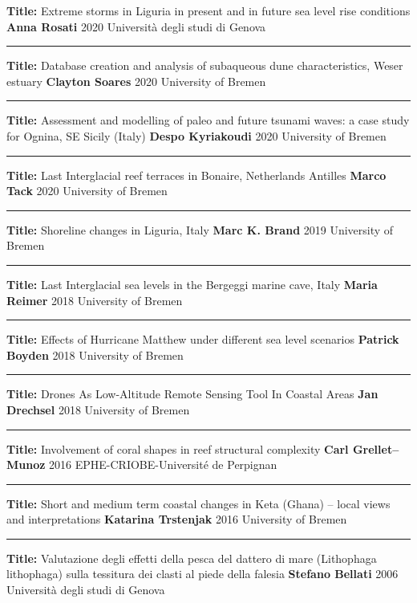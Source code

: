 \documentclass[%
               doublesided,
               paper=a4,
               fontsize=10pt
              ]{my-resume}
\begin{document}
    \publication
	{\textbf{Title:} Extreme storms in Liguria in present and in future sea level rise conditions} %
	{\textbf{Anna Rosati}} %
	{2020} %
	{Università degli studi di Genova} %
	{} %
\smallskip
\hrule
\smallskip
    \publication
	{\textbf{Title:} Database creation and analysis of subaqueous dune characteristics, Weser estuary} %
	{\textbf{Clayton Soares}} %
	{2020} %
	{University of Bremen} %
	{} %
\smallskip
\hrule
\smallskip
    \publication
	{\textbf{Title:} Assessment and modelling of paleo and future tsunami waves: a case study for Ognina, SE Sicily (Italy)} %
	{\textbf{Despo Kyriakoudi}} %
	{2020} %
	{University of Bremen} %
	{} %
\smallskip
\hrule
\smallskip
    \publication
	{\textbf{Title:} Last Interglacial reef terraces in Bonaire, Netherlands Antilles} %
	{\textbf{Marco Tack}} %
	{2020} %
	{University of Bremen} %
	{} %
\smallskip
\hrule
\smallskip
    \publication
	{\textbf{Title:} Shoreline changes in Liguria, Italy} %
	{\textbf{Marc K. Brand}} %
	{2019} %
	{University of Bremen} %
	{} %
\smallskip
\hrule
\smallskip
    \publication
	{\textbf{Title:} Last Interglacial sea levels in the Bergeggi marine cave, Italy} %
	{\textbf{Maria Reimer}} %
	{2018} %
	{University of Bremen} %
	{} %
\smallskip
\hrule
\smallskip
    \publication
	{\textbf{Title:} Effects of Hurricane Matthew under different sea level scenarios} %
	{\textbf{Patrick Boyden}} %
	{2018} %
	{University of Bremen} %
	{} %
\smallskip
\hrule
\smallskip
    \publication
	{\textbf{Title:} Drones As Low-Altitude Remote Sensing Tool In Coastal Areas} %
	{\textbf{Jan Drechsel}} %
	{2018} %
	{University of Bremen} %
	{} %
\smallskip
\hrule
\smallskip
    \publication
	{\textbf{Title:} Involvement of coral shapes in reef structural complexity} %
	{\textbf{Carl Grellet–Munoz}} %
	{2016} %
	{EPHE-CRIOBE-Université de Perpignan} %
	{} %
\smallskip
\hrule
\smallskip
    \publication
	{\textbf{Title:} Short and medium term coastal changes in Keta (Ghana) – local views and interpretations} %
	{\textbf{Katarina Trstenjak}} %
	{2016} %
	{University of Bremen} %
	{} %
\smallskip
\hrule
\smallskip
    \publication
	{\textbf{Title:} Valutazione degli effetti della pesca del dattero di mare (Lithophaga lithophaga) sulla tessitura dei clasti al piede della falesia} %
	{\textbf{Stefano Bellati}} %
	{2006} %
	{Università degli studi di Genova} %
	{} %
\end{document}
